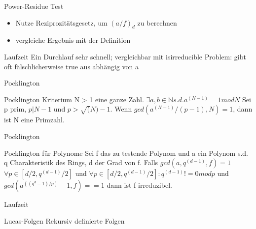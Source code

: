 \documentclass[german,10pt,xcolor=colortbl,compress]{beamer}%
\newcommand{\NN}{\mathbb{N}}
\begin{document}
	
	\begin{frame}{Power-Residue Test}
		\begin{itemize}
		\item Nutze Reziprozitätsgesetz, um $(a/f)_d $ zu berechnen
		\item vergleiche Ergebnis mit der Definition
		\end{itemize}
	\end{frame}

	
	\begin{frame}{Laufzeit}
		Ein Durchlauf sehr schnell; vergleichbar mit isirreducible
		Problem: gibt oft fälschlicherweise true aus
		abhängig von a
		
	\end{frame}

	
	\begin{frame}{Pocklington}
		\begin{block}{Pocklington Kriterium}
			N > 1 eine ganze Zahl. $ \exists a, b \in \NN s.d. a ^(N-1) = 1 mod N$ 
			Sei p prim, $p	| N-1$ und $p> \sqrt(N)-1$.
			Wenn $gcd(a^(N-1)/(p-1),N) =1$, dann ist N eine Primzahl.
		\end{block}
	\end{frame}

		
	\begin{frame}{Pocklington}
		\begin{block}{Pocklington für Polynome}
			Sei f das zu testende Polynom und  a ein Polynom s.d. 
			q Charakteristik des Rings, d der Grad von f.
			Falls $gcd(a,q^(d-1),f)=1$$\forall p \in [d/2, q^(d-1)/2]$ und 
			$\forall p \in [d/2, q^(d-1)/2]: q^(d-1) != 0 mod p$ und $gcd(a^((q^d-1)/p)-1 , f)==1$ dann ist f irreduzibel. 
			
		\end{block}
	\end{frame}

	\begin{frame}{Laufzeit}
		
	\end{frame}

	\begin{frame}{Lucas-Folgen}
		Rekursiv definierte Folgen 
	\end{frame}
	
\end{document}

